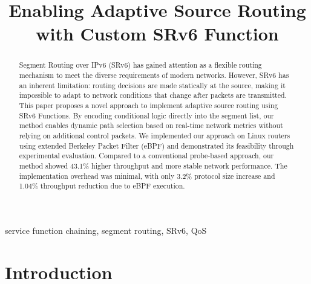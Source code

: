 \documentclass[conference]{IEEEtran}
\begin{document}
\title{Enabling Adaptive Source Routing with Custom SRv6 Function}

\author{
}

\maketitle

\begin{abstract}
  Segment Routing over IPv6 (SRv6) has gained attention as a flexible routing mechanism to meet the diverse requirements of modern networks.
  However, SRv6 has an inherent limitation: routing decisions are made statically at the source, making it impossible to adapt to network conditions that change after packets are transmitted.
  This paper proposes a novel approach to implement adaptive source routing using SRv6 Functions.
  By encoding conditional logic directly into the segment list, our method enables dynamic path selection based on real-time network metrics without relying on additional control packets.
  We implemented our approach on Linux routers using extended Berkeley Packet Filter (eBPF) and demonstrated its feasibility through experimental evaluation.
  Compared to a conventional probe-based approach, our method showed 43.1\% higher throughput and more stable network performance.
  The implementation overhead was minimal, with only 3.2\% protocol size increase and 1.04\% throughput reduction due to eBPF execution.
\end{abstract}

\begin{IEEEkeywords}
  service function chaining, segment routing, SRv6, QoS
\end{IEEEkeywords}

\section{Introduction}
\end{document}
